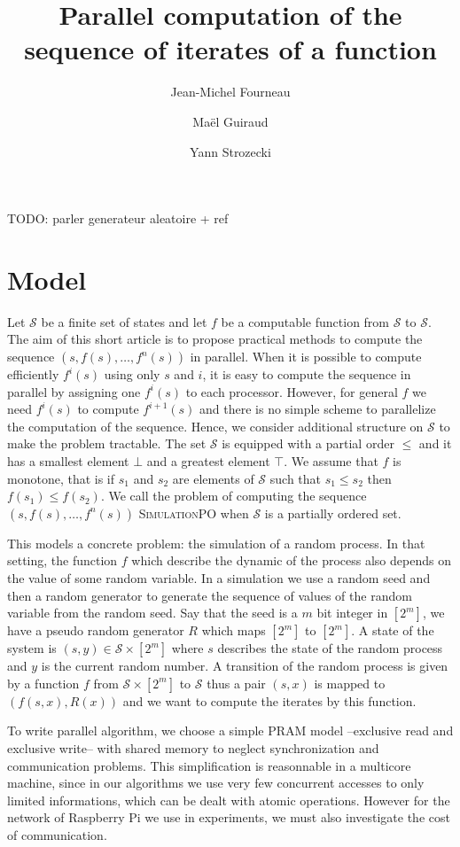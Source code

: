 \documentclass[a4paper,10pt]{article}
\title{Parallel computation of the sequence of iterates of a function }
\author{Jean-Michel Fourneau \and Maël Guiraud \and Yann Strozecki}
\newcommand{\cS}{\mathcal{S}}
\newcommand{\todo}[1]{{\color{red} TODO: {#1}}}
\begin{document}
\maketitle

\begin{abstract}

\end{abstract}
\todo{parler generateur aleatoire + ref}
\section{Model}

Let $\cS$ be a finite set of states and let $f$ be a computable function from $\cS$ to $\cS$. 
The aim of this short article is to propose practical methods to compute the sequence $(s,f(s),\dots,f^n(s))$ in parallel.
When it is possible to compute efficiently $f^i(s)$ using only $s$ and $i$, it is easy to compute the sequence
in parallel by assigning one $f^i(s)$ to each processor. However, for general $f$ we need $f^{i}(s)$ to compute $f^{i+1}(s)$ and there is no simple scheme to parallelize the computation of the sequence. 
Hence, we consider additional structure on $\cS$ to make the problem tractable. The set $\cS$ is equipped with a partial order 
$\leq$ and it has a smallest element $\bot$ and a greatest element $ \top$. We assume that $f$ is monotone, that is 
if $s_1$ and $s_2$ are elements of $\cS$ such that $s_1 \leq s_2$ then $f(s_1) \leq f(s_2)$.
We call the problem of computing the sequence $(s,f(s),\dots,f^n(s))$ \textsc{SimulationPO} when $\cS$ is a partially ordered set.

This models a concrete problem: the simulation of a random process. In that setting, the function $f$ which describe the dynamic of the process also depends on the value of some random variable. In a simulation we use a random seed and then a random generator to generate the sequence of values of the random variable from the random seed. Say that the seed is a $m$ bit integer in $[2^m]$, we have a pseudo random generator $R$ which maps $[2^m]$ to $[2^m]$. A state of the system is $(s,y) \in \cS \times [2^m]$ where $s$ describes the state of the random process and $y$ is the current random number. A transition of the random process is given by a function $f$ from $\cS \times [2^m]$ to $\cS$ thus a pair $(s,x)$ is mapped to $(f(s,x),R(x))$ and we want to compute the iterates by this function.

To write parallel algorithm, we choose a simple PRAM model --exclusive read and exclusive write-- with shared memory  to neglect synchronization and communication problems. This simplification is reasonnable in a multicore machine, since in our algorithms we use very few concurrent accesses to only limited informations, which can be dealt with atomic operations.  However for the network of Raspberry Pi we use in experiments, we must also investigate the cost of communication.
\end{document}
